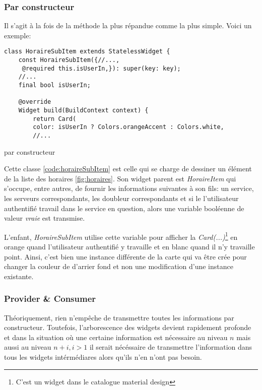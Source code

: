 \subsubsection{Par constructeur}
Il s'agit à la fois de la méthode la plus répandue comme la plus simple. Voici un exemple:

\begin{listing}[h]
    \begin{verbatim}
class HoraireSubItem extends StatelessWidget {
    const HoraireSubItem({//...,
     @required this.isUserIn,}): super(key: key);
    //...
    final bool isUserIn;

    @override
    Widget build(BuildContext context) {
        return Card(
        color: isUserIn ? Colors.orangeAccent : Colors.white,
        //...
    \end{verbatim}
    \caption{par constructeur}
    \label{code:horaireSubItem}
\end{listing}
Cette classe \ref{code:horaireSubItem} est celle qui se charge de dessiner un élément de la liste des horaires \ref{fig:horaires}. Son widget parent
est \textit{HoraireItem} qui s'occupe, entre autres, de fournir les informations suivantes à son fils: un service, les serveurs correspondants, les doubleur correspondants et
si le l'utilisateur authentifié travail dans le service en question, alors une variable booléenne de valeur \textit{vraie} est transmise.

L'enfant, \textit{HoraireSubItem} utilise cette variable pour afficher la \textit{Card(...)}\footnote{C'est un widget dans le catalogue material design}
en orange quand l'utilisateur authentifié y travaille et en blanc quand il n'y travaille point. Ainsi, c'est bien une instance différente de la carte qui
va être crée pour changer la couleur de d'arrier fond et non une modification d'une instance existante.


\subsubsection{Provider \& Consumer}

Théoriquement, rien n'empêche de transmettre toutes les informations par constructeur. Toutefois, l'arborescence des widgets devient rapidement profonde
et dans la situation où une certaine information est nécessaire au niveau \(n\) mais aussi au niveau \(n+i, i > 1\) il serait nécéssaire de transmettre l'information
dans tous les widgets intérmédiares alors qu'ils n'en n'ont pas besoin.




